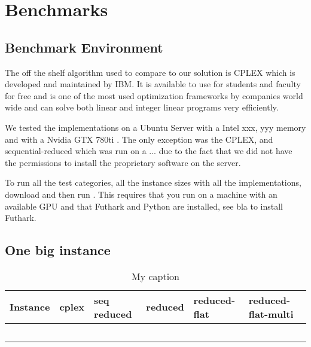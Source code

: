 \section{Benchmarks}
\subsection{Benchmark Environment}
The off the shelf algorithm used to compare to our solution is CPLEX which is developed and maintained by IBM. It is available to use for students and faculty for free and is one of the most used optimization frameworks by companies world wide and can solve both linear and integer linear programs very efficiently.

We tested the implementations on a Ubuntu  Server with a Intel xxx, yyy memory and with a Nvidia GTX 780ti . The only exception was the CPLEX, and sequential-reduced which was run on a ... due to the fact that we did not have the permissions to install the proprietary software on the server.

To run all the test categories, all the instance sizes with all the implementations, download  and then run . This requires that you run on a machine with an available GPU and that Futhark and Python are installed, see bla to install Futhark.

\subsection{One big instance}
\begin{table}[H]
	\centering
	\label{table:one_big_instance}
	\begin{tabular}{|l|l|l|l|l|l|}\hline
		Instance & cplex & seq reduced & reduced & reduced-flat & reduced-flat-multi \\\hline
		&       &             &         &              &                    \\\hline
		&       &             &         &              &                    \\\hline
		&       &             &         &              &                   \\\hline
		&       &             &         &              &                   \\\hline
		&       &             &         &              &                   \\\hline
	\end{tabular}
	\caption{My caption}
\end{table}

